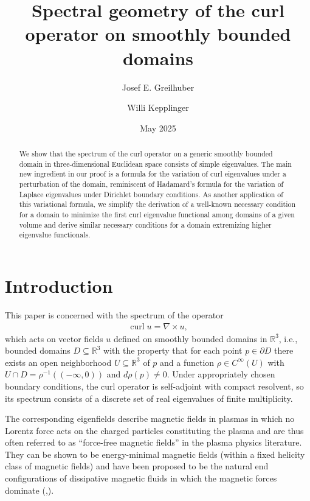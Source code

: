 \documentclass[11pt,reqno]{amsart}
\title{Spectral geometry of the curl operator on smoothly bounded domains}
\author{Josef E. Greilhuber}
\author{Willi Kepplinger}
\date{May 2025}
\DeclareMathOperator{\curl}{curl}
\begin{document}
\begin{abstract}
    We show that the spectrum of the curl operator on a generic smoothly bounded domain in three-dimensional Euclidean space consists of simple eigenvalues. The main new ingredient in our proof is a formula for the variation of curl eigenvalues under a perturbation of the domain, reminiscent of Hadamard's formula for the variation of Laplace eigenvalues under Dirichlet boundary conditions. As another application of this variational formula, we simplify the derivation of a well-known necessary condition for a domain to minimize the first curl eigenvalue functional among domains of a given volume and derive similar necessary conditions for a domain extremizing higher eigenvalue functionals.
\end{abstract}
\maketitle
\section{Introduction}

This paper is concerned with the spectrum of the operator 
\begin{align*}
    \curl u = \nabla \times u,
\end{align*}
which acts on vector fields $u$ defined on smoothly bounded domains in $\mathbb R^3$, i.e., bounded domains $D \subseteq \mathbb R^3$ with the property that for each point $p \in \partial D$ there exists an open neighborhood $U \subseteq \mathbb R^3$ of $p$ and a function $\rho \in C^\infty(U)$ with $U \cap D = \rho^{-1}((-\infty,0))$ and $d\rho(p) \neq 0$. Under appropriately chosen boundary conditions, the curl operator is self-adjoint with compact resolvent, so its spectrum consists of a discrete set of real eigenvalues of finite multiplicity.

The corresponding eigenfields describe magnetic fields in plasmas in which no Lorentz force acts on the charged particles constituting the plasma and are thus often referred to as ``force-free magnetic fields'' in the plasma physics literature. They can be shown to be energy-minimal magnetic fields (within a fixed helicity class of magnetic fields) and have been proposed to be the natural end configurations of dissipative magnetic fluids in which the magnetic forces dominate (\cite{Woltjer1958},\cite{LaurenceAvellaneda1991}).\par
\end{document}
